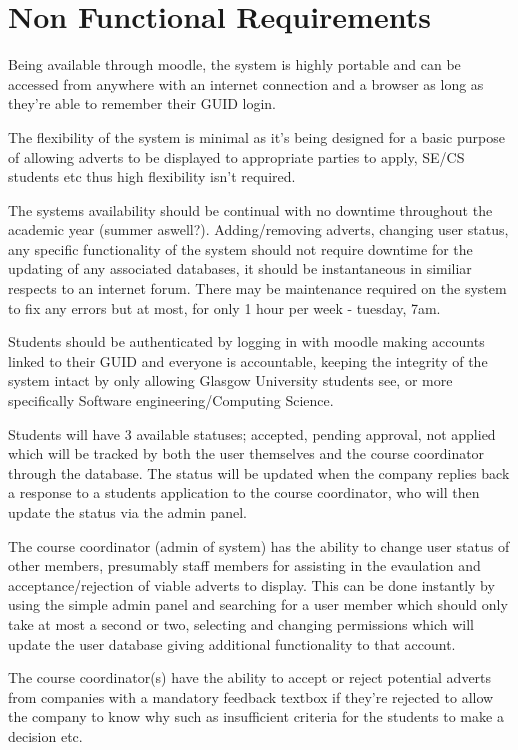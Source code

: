 \documentclass{l3deliverable}
\begin{document}

\section{Non Functional Requirements}

Being available through moodle, the system is highly portable and can be accessed from anywhere with an internet connection and a browser as long as they're able to remember their GUID login.

The flexibility of the system is minimal as it's being designed for a basic purpose of allowing adverts to be displayed to appropriate parties to apply, SE/CS students etc thus high flexibility isn't required.

The systems availability should be continual with no downtime throughout the academic year (summer aswell?). Adding/removing adverts, changing user status, any specific functionality of the system should not require downtime for the updating of any associated databases, it should be instantaneous in similiar respects to an internet forum. There may be maintenance required on the system to fix any errors but at most, for only 1 hour per week - tuesday, 7am.

Students should be authenticated by logging in with moodle making accounts linked to their GUID and everyone is accountable, keeping the integrity of the system intact by only allowing Glasgow University students see, or more specifically Software engineering/Computing Science.

Students will have 3 available statuses; accepted, pending approval, not applied which will be tracked by both the user themselves and the course coordinator through the database. The status will be updated when the company replies back a response to a students application to the course coordinator, who will then update the status via the admin panel.

The course coordinator (admin of system) has the ability to change user status of other members, presumably staff members for assisting in the evaulation and acceptance/rejection of viable adverts to display. This can be done instantly by using the simple admin panel and searching for a user member which should only take at most a second or two, selecting and changing permissions which will update the user database giving additional functionality to that account.

The course coordinator(s) have the ability to accept or reject potential adverts from companies with a mandatory feedback textbox if they're rejected to allow the company to know why such as insufficient criteria for the students to make a decision etc.
\end{document}
